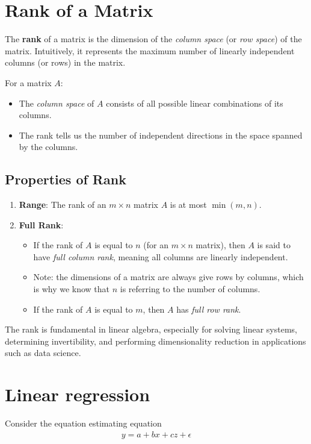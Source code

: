 \documentclass{article}
\begin{document}
\section{Rank of a Matrix}

The \textbf{rank} of a matrix is the dimension of the \textit{column space} (or \textit{row space}) of the matrix. Intuitively, it represents the maximum number of linearly independent columns (or rows) in the matrix.

For a matrix \( A \):
\begin{itemize}
    \item The \textit{column space} of \( A \) consists of all possible linear combinations of its columns.
    \item The rank tells us the number of independent directions in the space spanned by the columns.
\end{itemize}

\subsection*{Properties of Rank}
\begin{enumerate}
    \item \textbf{Range}: The rank of an \( m \times n \) matrix \( A \) is at most \( \min(m, n) \).
    \item \textbf{Full Rank}: 
    \begin{itemize}
        \item If the rank of \( A \) is equal to \( n \) (for an \( m \times n \) matrix), then \( A \) is said to have \textit{full column rank}, meaning all columns are linearly independent. 
        \item Note: the dimensions of a matrix are always give rows by columns, which is why we know that $n$ is referring to the number of columns.
        \item If the rank of \( A \) is equal to \( m \), then \( A \) has \textit{full row rank}.
    \end{itemize}
\end{enumerate}

The rank is fundamental in linear algebra, especially for solving linear systems, determining invertibility, and performing dimensionality reduction in applications such as data science.



\section{Linear regression}
Consider the equation estimating equation 
\begin{align}
    y = a + bx + cz + \epsilon \label{reg_eqn}
\end{align}
\end{document}
